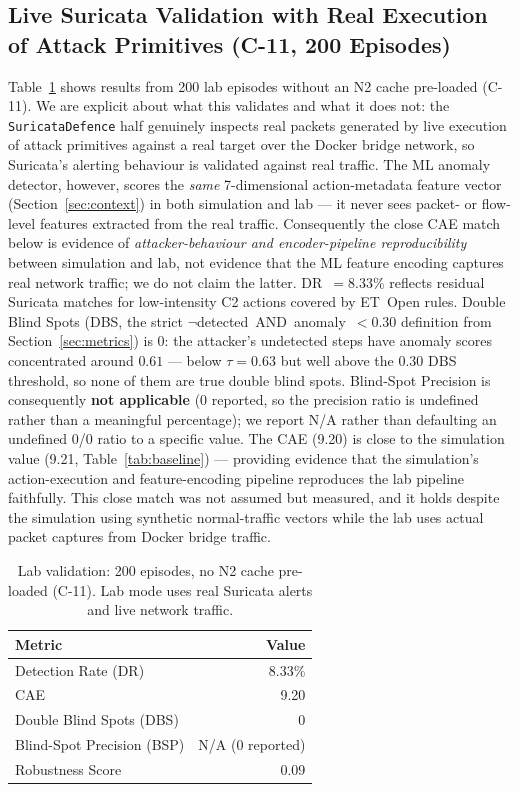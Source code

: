 \documentclass[sigconf]{acmart}
\begin{document}
\subsection{Live Suricata Validation with Real Execution of Attack Primitives (C-11, 200 Episodes)}
\label{sec:lab50}

Table~\ref{tab:lab50} shows results from 200 lab episodes without an
N2 cache pre-loaded (C-11). We are explicit about what this validates and
what it does not: the \texttt{SuricataDefence} half genuinely inspects
real packets generated by live execution of attack primitives against a
real target over the Docker bridge network, so Suricata's alerting
behaviour is validated against real traffic. The ML anomaly detector,
however, scores the \emph{same} 7-dimensional action-metadata feature
vector (Section~\ref{sec:context}) in both simulation and lab --- it
never sees packet- or flow-level features extracted from the real
traffic. Consequently the close CAE match below is evidence of
\emph{attacker-behaviour and encoder-pipeline reproducibility} between
simulation and lab, not evidence that the ML feature encoding captures
real network traffic; we do not claim the latter.
DR~$= 8.33\%$ reflects residual Suricata matches for low-intensity C2
actions covered by ET~Open rules. Double Blind Spots (DBS, the strict
$\neg$detected~AND~anomaly~$<0.30$ definition from
Section~\ref{sec:metrics}) is 0: the attacker's undetected steps have
anomaly scores concentrated around $0.61$ --- below $\tau=0.63$ but
well above the $0.30$ DBS threshold, so none of them are true double
blind spots. Blind-Spot Precision is consequently \textbf{not
applicable} (0 reported, so the precision ratio is undefined rather
than a meaningful percentage); we report N/A rather than defaulting
an undefined 0/0 ratio to a specific value. The CAE (9.20) is close to the simulation
value (9.21, Table~\ref{tab:baseline}) --- providing evidence that the
simulation's action-execution and feature-encoding pipeline reproduces
the lab pipeline faithfully. This close match was not assumed but
measured, and it holds despite the simulation using synthetic
normal-traffic vectors while the lab uses actual packet captures from
Docker bridge traffic.

\begin{table}[t]
\caption{Lab validation: 200 episodes, no N2 cache pre-loaded (C-11).
Lab mode uses real Suricata alerts and live network traffic.}
\label{tab:lab50}
\centering
\small
\begin{tabular}{l r}
\toprule
Metric & Value \\
\midrule
Detection Rate (DR)        & 8.33\% \\
CAE                        & 9.20 \\
Double Blind Spots (DBS)   & 0 \\
Blind-Spot Precision (BSP) & N/A (0 reported) \\
Robustness Score           & 0.09 \\
\bottomrule
\end{tabular}
\end{table}
\end{document}

